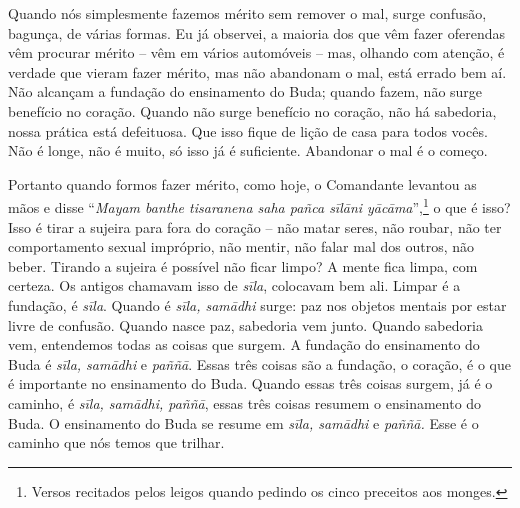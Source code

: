 Quando nós simplesmente fazemos mérito sem remover o mal, surge
confusão, bagunça, de várias formas. Eu já observei, a maioria dos que
vêm fazer oferendas vêm procurar mérito – vêm em vários automóveis –
mas, olhando com atenção, é verdade que vieram fazer mérito, mas não
abandonam o mal, está errado bem aí. Não alcançam a fundação do
ensinamento do Buda; quando fazem, não surge benefício no coração.
Quando não surge benefício no coração, não há sabedoria, nossa prática
está defeituosa. Que isso fique de lição de casa para todos vocês. Não
é longe, não é muito, só isso já é suficiente. Abandonar o mal é o
começo.

Portanto quando formos fazer mérito, como hoje, o Comandante
levantou as mãos e disse “\textit{Mayam banthe tisaranena saha pañca
sīlāni yācāma}”,\footnote{Versos recitados pelos leigos quando
pedindo os cinco preceitos aos monges.} o que é isso? Isso é tirar a
sujeira para fora do coração – não matar seres, não
roubar, não ter comportamento sexual impróprio, não mentir, não falar
mal dos outros, não beber. Tirando a sujeira é possível não ficar
limpo? A mente fica limpa, com certeza. Os antigos chamavam isso de
\textit{sīla}, colocavam bem ali. Limpar é a fundação, é
\textit{sīla}. Quando é \textit{sīla, samādhi} surge: paz nos
objetos mentais por estar livre de confusão. Quando nasce paz,
sabedoria vem junto. Quando sabedoria vem, entendemos todas as coisas
que surgem. A fundação do ensinamento do Buda é \textit{sīla,
samādhi} e\textit{ paññā}. Essas três coisas são a fundação, o
coração, é o que é importante no ensinamento do Buda. Quando essas três
coisas surgem, já é o caminho, é \textit{sīla, samādhi, paññā},
essas três coisas resumem o ensinamento do Buda. O ensinamento do Buda
se resume em \textit{sīla, samādhi} e\textit{ paññā.} Esse é o
caminho que nós temos que trilhar. 

